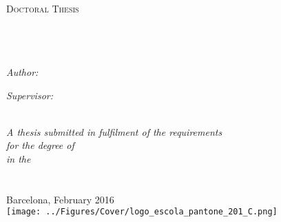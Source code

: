 \documentclass[
11pt, %
english, %
onehalfspacing %
]{MastersDoctoralThesis} %
\author{Oriol \textsc{Colomés Gené}} %
\begin{document}
\frontmatter %

\pagestyle{plain} %


\begin{titlepage}
\begin{center}

\textsc{\LARGE \univname}\\[1.5cm] %
\textsc{\Large Doctoral Thesis}\\[0.5cm] %

\HRule \\[0.4cm] %
{\huge \bfseries \ttitle}\\[0.4cm] %
\HRule \\[1.5cm] %
 
\begin{minipage}{0.4\textwidth}
\begin{flushleft} \large
\emph{Author:}\\
{\authorname} %
\end{flushleft}
\end{minipage}
\begin{minipage}{0.4\textwidth}
\begin{flushright} \large
\emph{Supervisor:} \\
{\supname} %
\end{flushright}
\end{minipage}\\[3cm]
 
\large \textit{A thesis submitted in fulfilment of the requirements\\ for the degree of \degreename}\\[0.3cm] %
\textit{in the}\\[0.4cm]
\progname\\[0.5cm]
\deptname\\[2cm] %
 
{\large Barcelona, February 2016}\\[2cm] %
\texttt{[image: ../Figures/Cover/logo\_escola\_pantone\_201\_C.png]}
 
\vfill
\end{center}
\end{titlepage}
\end{document}

